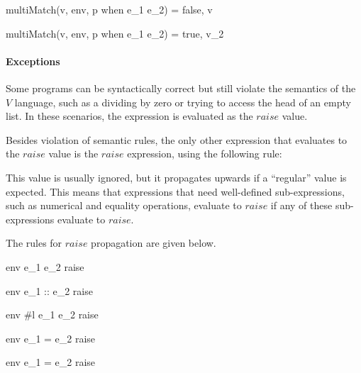 \documentclass{article}
\begin{document}
  {multiMatch(v, \mbox{env}, p \; \mbox{when} \; e_1 \rightarrow e_2) = false, v}

  {multiMatch(v, \mbox{env}, p \; \mbox{when} \; e_1 \rightarrow e_2) = true, v_2}

\paragraph{Exceptions}

Some programs can be syntactically correct but still violate the semantics of the $V$ language, such as a dividing by zero or trying to access the head of an empty list.
In these scenarios, the expression is evaluated as the $raise$ value.

Besides violation of semantic rules, the only other expression that evaluates to the $raise$ value is the $raise$ expression, using the following rule:


This value is usually ignored, but it propagates upwards if a ``regular'' value is expected.
This means that expressions that need well-defined sub-expressions, such as numerical and equality operations, evaluate to $raise$ if any of these sub-expressions evaluate to $raise$.

The rules for $raise$ propagation are given below.

    {\mbox{env} \vdash e_1 e_2 \Downarrow raise}

    {\mbox{env} \vdash e_1 :: e_2 \Downarrow raise}

    {\mbox{env} \vdash \#l \; e_1 \; e_2 \Downarrow raise}

    {\mbox{env} \vdash e_1 = e_2 \Downarrow raise}

    {\mbox{env} \vdash e_1 = e_2 \Downarrow raise}
\end{document}
